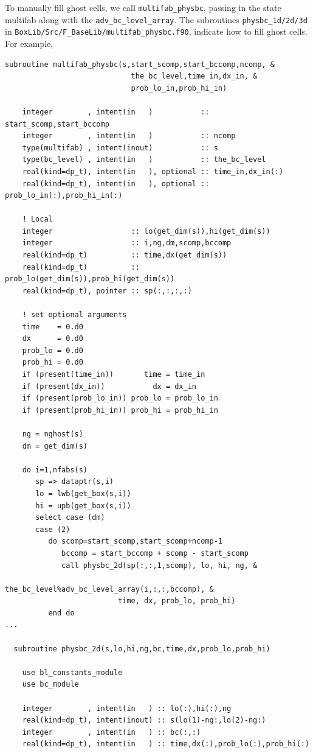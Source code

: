 To manually fill ghost cells, we call {\tt multifab\_physbc}, passing in the state multifab
along with the {\tt adv\_bc\_level\_array}.  The subroutines {\tt physbc\_1d/2d/3d} in
{\tt BoxLib/Src/F\_BaseLib/multifab\_physbc.f90}, indicate how to fill ghost cells.  For example,
\begin{lstlisting}[backgroundcolor=\color{light-green}]
  subroutine multifab_physbc(s,start_scomp,start_bccomp,ncomp, &
                             the_bc_level,time_in,dx_in, &
                             prob_lo_in,prob_hi_in)

    integer        , intent(in   )           :: start_scomp,start_bccomp
    integer        , intent(in   )           :: ncomp
    type(multifab) , intent(inout)           :: s
    type(bc_level) , intent(in   )           :: the_bc_level
    real(kind=dp_t), intent(in   ), optional :: time_in,dx_in(:)
    real(kind=dp_t), intent(in   ), optional :: prob_lo_in(:),prob_hi_in(:)

    ! Local
    integer                  :: lo(get_dim(s)),hi(get_dim(s))
    integer                  :: i,ng,dm,scomp,bccomp
    real(kind=dp_t)          :: time,dx(get_dim(s))
    real(kind=dp_t)          :: prob_lo(get_dim(s)),prob_hi(get_dim(s))
    real(kind=dp_t), pointer :: sp(:,:,:,:)
    
    ! set optional arguments
    time    = 0.d0
    dx      = 0.d0
    prob_lo = 0.d0
    prob_hi = 0.d0
    if (present(time_in))       time = time_in
    if (present(dx_in))           dx = dx_in
    if (present(prob_lo_in)) prob_lo = prob_lo_in
    if (present(prob_hi_in)) prob_hi = prob_hi_in

    ng = nghost(s)
    dm = get_dim(s)
    
    do i=1,nfabs(s)
       sp => dataptr(s,i)
       lo = lwb(get_box(s,i))
       hi = upb(get_box(s,i))
       select case (dm)
       case (2)
          do scomp=start_scomp,start_scomp+ncomp-1
             bccomp = start_bccomp + scomp - start_scomp
             call physbc_2d(sp(:,:,1,scomp), lo, hi, ng, &
                          the_bc_level%adv_bc_level_array(i,:,:,bccomp), &
                          time, dx, prob_lo, prob_hi)
          end do
...

  subroutine physbc_2d(s,lo,hi,ng,bc,time,dx,prob_lo,prob_hi)

    use bl_constants_module
    use bc_module

    integer        , intent(in   ) :: lo(:),hi(:),ng
    real(kind=dp_t), intent(inout) :: s(lo(1)-ng:,lo(2)-ng:)
    integer        , intent(in   ) :: bc(:,:)
    real(kind=dp_t), intent(in   ) :: time,dx(:),prob_lo(:),prob_hi(:)


\end{lstlisting}
